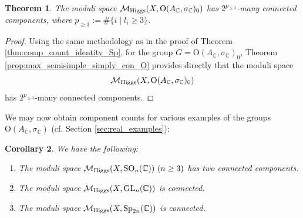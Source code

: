 \documentclass[oneside,11pt]{amsart}
\newtheorem{thm}{Theorem}[section]
\newtheorem{cor}[thm]{Corollary}
\theoremstyle{definition}
\theoremstyle{remark}
\numberwithin{thm}{section}
\numberwithin{equation}{section}
\begin{document}
\begin{thm}\label{thm:comp_count_identity_O}
The moduli space $\mathcal{M}_{\rm Higgs}(X,\mathrm{O}(A_\mathbb{C}, \sigma_{\mathbb{C}})_0)$ has $2^{p_{\geq3}}$-many connected components, where $p_{\geq3}:=\#\{i\mid l_i\geq3\}$.
\end{thm}

\begin{proof}
Using the same methodology as in the proof of Theorem \ref{thm:comp_count_identity_Sp}, for the group $G=\mathrm{O}(A_\mathbb{C}, \sigma_{\mathbb{C}})_0$, Theorem \ref{prop:max_semisimple_simply_con_O} provides directly that the moduli space \[\mathcal{M}_{\rm Higgs}(X,\mathrm{O}(A_\mathbb{C}, \sigma_{\mathbb{C}})_0)\] has $2^{p_{\geq3}}$-many connected components.
\end{proof}

We may now obtain component counts for various examples of the groups $\mathrm{O}(A_\mathbb{C}, \sigma_{\mathbb{C}}) $ (cf. Section \ref{sec:real_examples}):

\begin{cor}\label{cor:comp_counts_specific_O} We have the following: 
\begin{enumerate}
 \item The moduli space $\mathcal{M}_{\rm Higgs}(X,\mathrm{SO}_n(\mathbb{C}))\ (n\geq3)$ has two connected components.
 \item The moduli space $\mathcal{M}_{\rm Higgs}(X,\mathrm{GL}_n(\mathbb{C}))$ is connected.
 \item The moduli space $\mathcal{M}_{\rm Higgs}(X,\mathrm{Sp}_{2n}(\mathbb{C}))$ is connected.
\end{enumerate}    
\end{cor}
\end{document}
